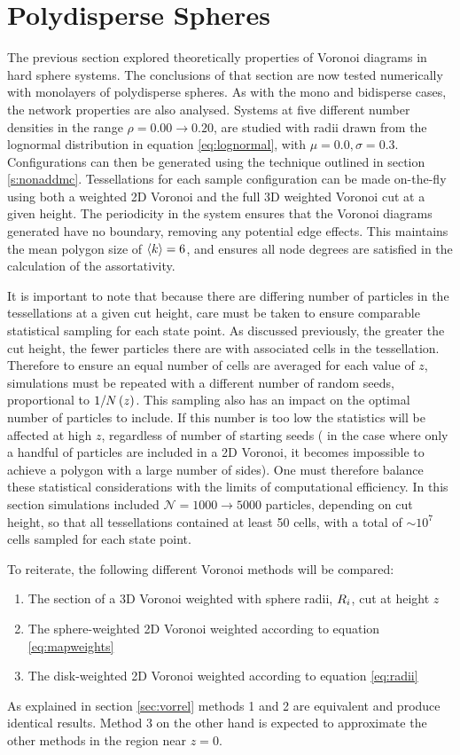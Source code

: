 \section{Polydisperse Spheres}

The previous section explored theoretically properties of Voronoi diagrams in \qtd{} hard sphere systems.
The conclusions of that section are now tested numerically with monolayers of polydisperse spheres.
As with the mono and bidisperse cases, the network properties are also analysed.
Systems at five different number densities in the range $\rho=0.00\rightarrow0.20$, are studied with radii drawn from the lognormal distribution in equation \eqref{eq:lognormal}, with $\mu=0.0,\sigma=0.3$.
Configurations can then be generated using the \mc{} technique outlined in section \ref{s:nonaddmc}.
Tessellations for each sample configuration can be made on-the-fly using both a weighted 2D Voronoi and the full 3D weighted Voronoi cut at a given height.
The periodicity in the system ensures that the Voronoi diagrams generated have no boundary, removing any potential edge effects. 
This maintains the mean polygon size of $\langle k \rangle=6$, and ensures all node degrees are satisfied in the calculation of the assortativity.

It is important to note that because there are differing number of particles in the tessellations at a given cut height, care must be taken to ensure comparable statistical sampling for each state point. 
As discussed previously, the greater the cut height, the fewer particles there are with associated cells in the tessellation.
Therefore to ensure an equal number of cells are averaged for each value of $z$, simulations must be repeated with a different number of random seeds, proportional to  $1/N\left(z\right)$.
This sampling also has an impact on the optimal number of particles to include.
If this number is too low the statistics will be affected at high $z$, regardless of number of starting seeds (\eg{} in the case where only a handful of particles are included in a 2D Voronoi, it becomes impossible to achieve a polygon with a large number of sides).
One must therefore balance these statistical considerations with the limits of computational efficiency.
In this section simulations included $\mathcal{N}=1000\rightarrow 5000$ particles, depending on cut height, so that all tessellations contained at least 50 cells, with a total of $\sim 10^7$ cells sampled for each state point.

To reiterate, the following different Voronoi methods will be compared:
\begin{enumerate}
	\item The section of a 3D Voronoi weighted with sphere radii, $R_i$, cut at height $z$
	\item The sphere\--weighted 2D Voronoi weighted according to equation \eqref{eq:mapweights}
	\item The disk\--weighted 2D Voronoi weighted according to equation \eqref{eq:radii}
\end{enumerate}
As explained in section \ref{sec:vorrel} methods 1 and 2 are equivalent and produce identical results.
Method 3 on the other hand is expected to approximate the other methods in the region near $z=0$.

